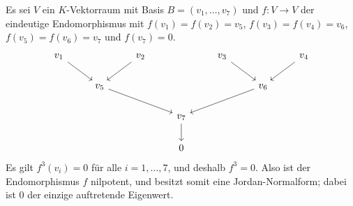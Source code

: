 \documentclass[a4paper,10pt,numbers = noenddot]{scrartcl}
\begin{document}
\begin{example}
  Es sei $V$ ein $K$-Vektorraum mit Basis $B = (v_1, \dotsc, v_7)$ und $f \colon V \to V$ der eindeutige Endomorphismus mit $f(v_1) = f(v_2) = v_5$, $f(v_3) = f(v_4) = v_6$, $f(v_5) = f(v_6) = v_7$ und $f(v_7) = 0$.
  \[
    \begin{tikzcd}
        v_1
        \arrow{dr}
      & {}
      & v_2
        \arrow{dl}
      & {}
      & v_3
        \arrow{dr}
      & {}
      & v_4
        \arrow{dl}
      \\
        {}
      & v_5
        \arrow{drr}
      & {}
      & {}
      & {}
      & v_6
        \arrow{dll}
      & {}
      \\
        {}
      & {}
      & {}
      & v_7
        \arrow{d}
      & {}
      & {}
      & {}
      \\
        {}
      & {}
      & {}
      & 0
      & {}
      & {}
      & {}
    \end{tikzcd}
  \]
  Es gilt $f^3(v_i) = 0$ für alle $i = 1, \dotsc, 7$, und deshalb $f^3 = 0$.
  Also ist der Endomorphismus $f$ nilpotent, und besitzt somit eine Jordan-Normalform;
  dabei ist $0$ der einzige auftretende Eigenwert.
  

\end{example}
\end{document}
